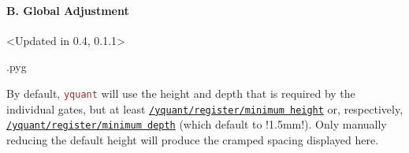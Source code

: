 \documentclass{scrartcl}
\makeatletter
\newenvironment{codeexample}{%
   \VerbatimEnvironment%
   \let\FVB@VerbatimOut\minted@FVB@VerbatimOut
   \let\FVE@VerbatimOut\minted@FVE@VerbatimOut
   \minted@configlang{tex}%
   \minted@fvset
   \begin{VerbatimOut}[codes={\catcode`\^^I=12},firstline,lastline]{\minted@jobname.pyg}%
}{
   \end{VerbatimOut}%
   \minted@langlinenoson%
   \savebox\codeexamplebox{ \minted@jobname.pyg}%
   \ifdim\wd\codeexamplebox>\dimexpr.5\linewidth-3mm\relax%
      \wd\codeexamplebox=.5\linewidth%
   \else%
      \wd\codeexamplebox=\dimexpr\wd\codeexamplebox+3mm\relax%
   \fi%
   \noindent\begin{minipage}{\wd\codeexamplebox}%
      \centering%
      \usebox\codeexamplebox%
   \end{minipage}%
   \begin{minipage}{\dimexpr\linewidth-\wd\codeexamplebox\relax}%
      \expandafter\minted@pygmentize\expandafter{\minted@lang}%
   \end{minipage}%
   \minted@langlinenosoff%
   \par%
}
\newenvironment{codeexample*}{%
   \VerbatimEnvironment%
   \let\FVB@VerbatimOut\minted@FVB@VerbatimOut
   \let\FVE@VerbatimOut\minted@FVE@VerbatimOut
   \minted@configlang{tex}%
   \minted@fvset
   \begin{VerbatimOut}[codes={\catcode`\^^I=12},firstline,lastline]{\minted@jobname.pyg}%
}{
   \end{VerbatimOut}%
   \minted@langlinenoson%
   \begin{adjustbox}{center}
       \minted@jobname.pyg %
   \end{adjustbox}\nopagebreak
   \expandafter\minted@pygmentize\expandafter{\minted@lang}%
   \minted@langlinenosoff%
   \par%
}
\def\pkg#1{\textcolor{brown}{\texttt{#1}}}
\def\style#1{\hyperref[style:#1]{\texttt{#1}}}
\def\Yquant{\pkg{yquant}}
\makeatother
\begin{document}
            \clearpage
            \paragraph{B. Global Adjustment}\leavevmode
               \begin{example}
                  \begin{codeexample*}
                  \end{codeexample*}
               \end{example}

               \begin{example}<Updated in 0.4, 0.1.1>
                  \begin{codeexample}
                  \end{codeexample}
                  By default, \Yquant{} will use the height and depth that is required by the individual gates, but at least \style{/yquant/register/minimum height} or, respectively, \style{/yquant/register/minimum depth} (which default to \tex!1.5mm!).
                  Only manually reducing the default height will produce the cramped spacing displayed here.
               \end{example}

            \clearpage
\end{document}
